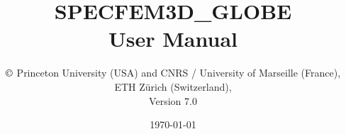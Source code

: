 \documentclass[oneside,english]{book}
\begin{document}

\thispagestyle{empty}
\begin{center}
\vspace*{-1.8truecm}
\noindent{}
\end{center}
%
\title{\thispagestyle{empty}\textbf{SPECFEM3D\_GLOBE}\\
\textbf{User Manual}}
%
\author{$\copyright$ Princeton University (USA) and CNRS / University of Marseille (France),\\
ETH Z\"urich (Switzerland),\\
Version 7.0}

\date{\today}

\maketitle




\newpage{}




\newpage{}

\tableofcontents{}



























\end{document}
